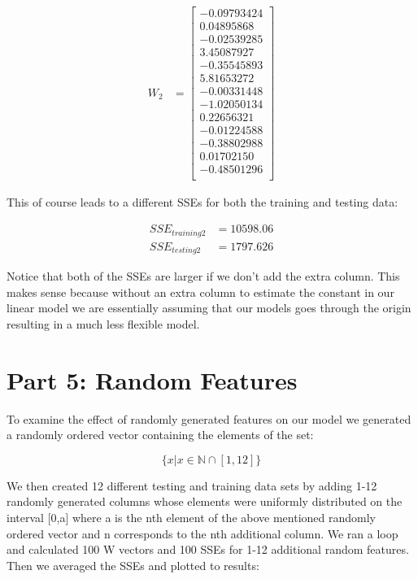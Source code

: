 \documentclass{article}
\begin{document}
	\begin{align}
		W_{2} &= \begin{bmatrix}
			-0.09793424 \\
			0.04895868 \\
			-0.02539285 \\
			3.45087927 \\
			-0.35545893 \\
			5.81653272 \\
			-0.00331448 \\
			-1.02050134 \\
			0.22656321 \\
			-0.01224588 \\
			-0.38802988 \\
			0.01702150 \\
			-0.48501296 \\
		\end{bmatrix}
	\end{align}
	
	This of course leads to a different SSEs for both the training and testing data:
	
	\begin{align}
	SSE_{training 2} &= 10598.06 \\
	SSE_{testing 2} &= 1797.626
	\end{align}
	
Notice that both of the SSEs are larger if we don't add the extra column. This makes sense because without an extra column to estimate the constant in our linear model we are essentially assuming that our models goes through the origin resulting in a much less flexible model.
	
	\section*{Part 5: Random Features}
	
To examine the effect of randomly generated features on our model we generated a randomly ordered vector containing the elements of the set:
	
	$$
	\{x|x\in\mathbb{N} \cap [1,12] \}
	$$
	
We then created 12 different testing and training data sets by adding 1-12 randomly generated columns whose elements were uniformly distributed on the interval [0,a] where a is the nth element of the above mentioned randomly ordered vector and n corresponds to the nth additional column. We ran a loop and calculated 100 W vectors and 100 SSEs for 1-12 additional random features. Then we averaged the SSEs and plotted to results:
\newpage
	
\end{document}
